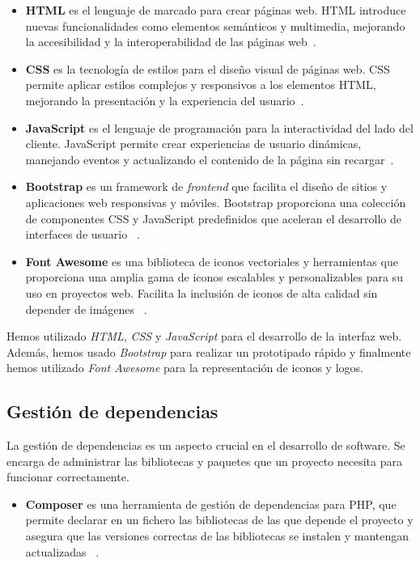 \begin{itemize}
    \item \textbf{HTML} es el lenguaje de marcado para crear páginas web.
    HTML introduce nuevas funcionalidades como elementos semánticos y multimedia, mejorando la accesibilidad y la
    interoperabilidad de las páginas web~\cite{url_html5}.
    \item \textbf{CSS} es la tecnología de estilos para el diseño visual de páginas web.
    CSS permite aplicar estilos complejos y responsivos a los elementos HTML, mejorando la presentación y la
    experiencia del usuario~\cite{url_css3}.
    \item \textbf{JavaScript} es el lenguaje de programación para la interactividad del lado del cliente.
    JavaScript permite crear experiencias de usuario dinámicas, manejando eventos y actualizando el contenido de la
    página sin recargar~\cite{url_javascript}.
    \item \textbf{Bootstrap} es un framework de \textit{frontend} que facilita el diseño de sitios y aplicaciones web
    responsivas y móviles.
    Bootstrap proporciona una colección de componentes CSS y JavaScript predefinidos que aceleran el desarrollo de
    interfaces de usuario ~\cite{url_bootstrap}.
    \item \textbf{Font Awesome} es una biblioteca de iconos vectoriales y herramientas que proporciona una amplia
    gama de iconos escalables y personalizables para su uso en proyectos web.
    Facilita la inclusión de iconos de alta calidad sin depender de imágenes ~\cite{url_fontawesome}.
\end{itemize}

Hemos utilizado \textit{HTML}, \textit{CSS} y \textit{JavaScript} para el desarrollo de la interfaz web.
Además, hemos usado \textit{Bootstrap} para realizar un prototipado rápido y finalmente hemos utilizado
\textit{Font Awesome} para la representación de iconos y logos.

\subsection*{Gestión de dependencias}

La gestión de dependencias es un aspecto crucial en el desarrollo de software.
Se encarga de administrar las bibliotecas y paquetes que un proyecto necesita para funcionar correctamente.

\begin{itemize}
    \item \textbf{Composer}
    es una herramienta de gestión de dependencias para PHP, que permite declarar en un fichero las bibliotecas de las
    que depende el proyecto y asegura que las versiones correctas de las bibliotecas se instalen y mantengan
    actualizadas ~\cite{url_composer}.
\end{itemize}

